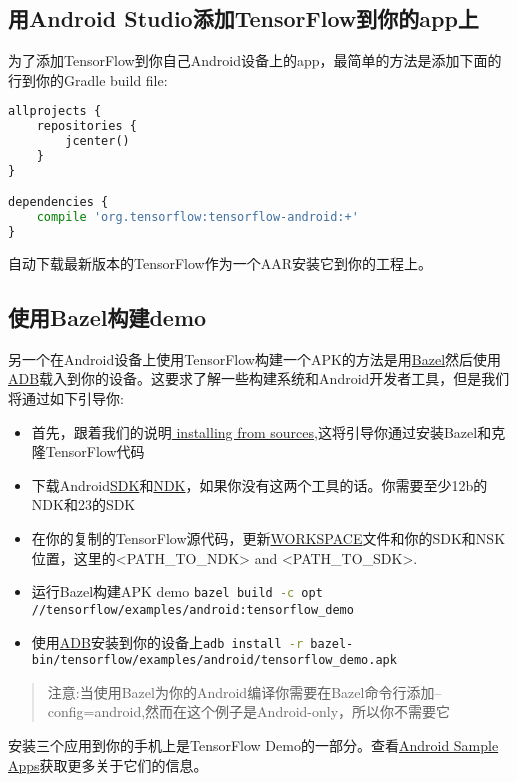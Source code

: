 \subsection{用Android Studio添加TensorFlow到你的app上}
为了添加TensorFlow到你自己Android设备上的app，最简单的方法是添加下面的行到你的Gradle build file:
\begin{lstlisting}[language=Python]
allprojects {
    repositories {
        jcenter()
    }
}

dependencies {
    compile 'org.tensorflow:tensorflow-android:+'
}

\end{lstlisting}
自动下载最新版本的TensorFlow作为一个AAR安装它到你的工程上。
\subsection{使用Bazel构建demo}\label{subseq:Bazel构建}
另一个在Android设备上使用TensorFlow构建一个APK的方法是用\href{https://bazel.build/}{Bazel}然后使用\href{https://developer.android.com/studio/command-line/adb.html?hl=zh-cn}{ADB}载入到你的设备。这要求了解一些构建系统和Android开发者工具，但是我们将通过如下引导你:
\begin{itemize}
\item 首先，跟着我们的说明\href{https://www.tensorflow.org/install/install_sources?hl=zh-cn}{ installing from sources},这将引导你通过安装Bazel和克隆TensorFlow代码
\item 下载Android\href{https://developer.android.com/studio/index.html?hl=zh-cn}{SDK}和\href{https://developer.android.com/ndk/downloads/index.html?hl=zh-cn}{NDK}，如果你没有这两个工具的话。你需要至少12b的NDK和23的SDK
\item 在你的复制的TensorFlow源代码，更新\href{https://github.com/tensorflow/tensorflow/blob/master/WORKSPACE}{WORKSPACE}文件和你的SDK和NSK位置，这里的<PATH\_TO\_NDK> and <PATH\_TO\_SDK>.
\item 运行Bazel构建APK demo \lstinline[language=Bash]{bazel build -c opt //tensorflow/examples/android:tensorflow_demo}
\item 使用\href{https://developer.android.com/studio/command-line/adb.html?hl=zh-cn#move}{ADB}安装到你的设备上\lstinline[language=Bash]{adb install -r bazel-bin/tensorflow/examples/android/tensorflow_demo.apk}
\end{itemize}
\begin{quote}
注意:当使用Bazel为你的Android编译你需要在Bazel命令行添加--config=android,然而在这个例子是Android-only，所以你不需要它
\end{quote}
安装三个应用到你的手机上是TensorFlow Demo的一部分。查看\href{https://www.tensorflow.org/mobile/android_build?hl=zh-cn#android_sample_apps}{Android Sample Apps}获取更多关于它们的信息。
